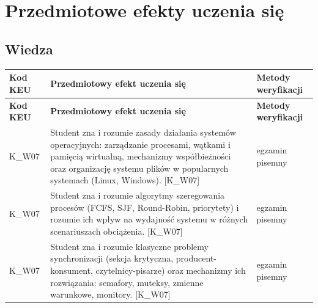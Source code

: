 \documentclass[12pt, a4paper]{article}
\newcommand{\thdrule}{\noalign{\global\setlength{\extrarowheight}{0pt}}}
\newcommand{\thdend}{\noalign{\global\setlength{\extrarowheight}{3pt}}}
\begin{document}
\section{Przedmiotowe efekty uczenia się}

\subsection*{Wiedza}
{\scriptsize
\begin{longtable}{m{1.6cm}m{9.0cm}m{4.2cm}}
\thdrule\toprule
\rowcolor{pjatkRed} {\color{white}\footnotesize\textbf{\vphantom{Ag}Kod KEU}} & {\color{white}\footnotesize\textbf{\vphantom{Ag}Przedmiotowy efekt uczenia się}} & {\color{white}\footnotesize\textbf{\vphantom{Ag}Metody weryfikacji}} \\
\midrule\thdend
\endfirsthead
\thdrule\toprule
\rowcolor{pjatkRed} {\color{white}\footnotesize\textbf{\vphantom{Ag}Kod KEU}} & {\color{white}\footnotesize\textbf{\vphantom{Ag}Przedmiotowy efekt uczenia się}} & {\color{white}\footnotesize\textbf{\vphantom{Ag}Metody weryfikacji}} \\
\midrule\thdend
\endhead
  \rowcolor{tableRowLight} K\_W07 & Student zna i rozumie zasady działania systemów operacyjnych: zarządzanie procesami, wątkami i pamięcią wirtualną, mechanizmy współbieżności oraz organizację systemu plików w popularnych systemach (Linux, Windows). {[}K\_W07{]} & egzamin pisemny \\
  \rowcolor{tableRowAlt} K\_W07 & Student zna i rozumie algorytmy szeregowania procesów (FCFS, SJF, Round-Robin, priorytety) i rozumie ich wpływ na wydajność systemu w różnych scenariuszach obciążenia. {[}K\_W07{]} & egzamin pisemny \\
  \rowcolor{tableRowLight} K\_W07 & Student zna i rozumie klasyczne problemy synchronizacji (sekcja krytyczna, producent-konsument, czytelnicy-pisarze) oraz mechanizmy ich rozwiązania: semafory, muteksy, zmienne warunkowe, monitory. {[}K\_W07{]} & egzamin pisemny \\
\bottomrule
\end{longtable}}
\end{document}
